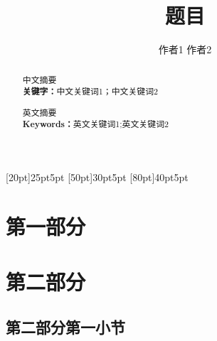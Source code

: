 \documentclass[12pt]{article}
\begin{document}
\linespread{1.5}
\pagestyle{fancy}
\fancyhead[L, R]{}
\title{\songti {} \textbf{题目}}
\author{\fangsong {}作者1 \quad 作者2}
\date{}
\maketitle
\begin{abstract}
    \fangsong 中文摘要\\
     \textbf{\heiti 关键字：}中文关键词1；中文关键词2
\end{abstract}
\begin{abstract}
     英文摘要 \\
     \textbf{\heiti Keywords：}英文关键词1;英文关键词2
\end{abstract}
\newpage
\tableofcontents
\contentsmargin{0pt}
\renewcommand\contentspage{\thecontentspage}
[20pt]{\vspace{1mm}\bfseries\songti{}}{25pt}{5pt}
[50pt]{\vspace{1mm}\songti{}}{30pt}{5pt}
[80pt]{\vspace{1mm}\songti{}}{40pt}{5pt}
\newpage
{}
\section{\songti{}第一部分}
\section{\songti{}第二部分}
\subsection{\songti{}第二部分第一小节}
\end{document}
